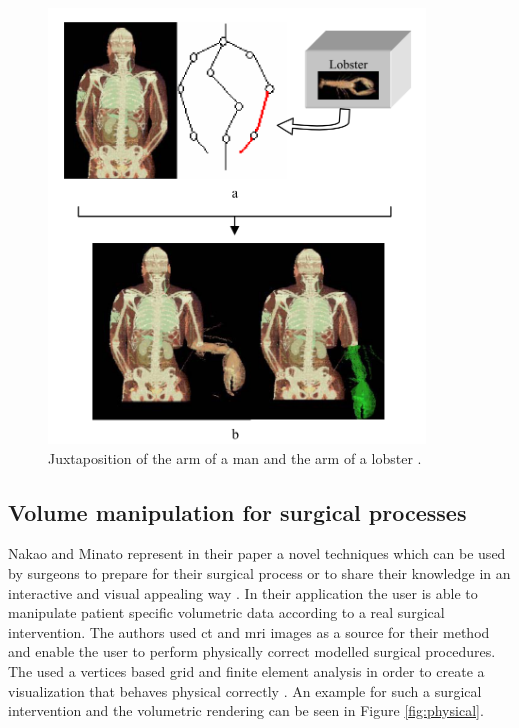 \begin{figure}
    \centering
	\includegraphics[width=10cm]{content/images/juxtaposition}
	\caption{Juxtaposition of the arm of a man and the arm of a lobster \cite{Singh2004}.} 
	\label{fig:juxtaposition}
\end{figure}

\subsection{Volume manipulation for surgical processes}

Nakao and Minato represent in their paper a novel techniques which can be used by surgeons to prepare for their surgical process or to share their knowledge in an interactive and visual appealing way \cite{Nakao2010}. In their application the user is able to manipulate patient specific volumetric data according to a real surgical intervention. The authors used \gls{ct} and \gls{mri} images as a source for their method and enable the user to perform physically correct modelled surgical procedures. The used a vertices based grid and finite element analysis in order to create a visualization that behaves physical correctly \cite{Nakao2010}.  An example for such a surgical intervention and the volumetric rendering can be seen in Figure \ref{fig:physical}.

